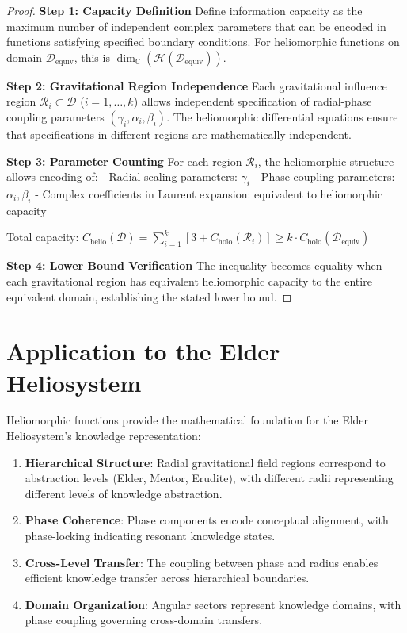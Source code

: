 \begin{proof}
\textbf{Step 1: Capacity Definition}
Define information capacity as the maximum number of independent complex parameters that can be encoded in functions satisfying specified boundary conditions. For heliomorphic functions on domain $\mathcal{D}_{\text{equiv}}$, this is $\dim_{\mathbb{C}}(\mathcal{H}(\mathcal{D}_{\text{equiv}}))$.

\textbf{Step 2: Gravitational Region Independence}
Each gravitational influence region $\mathcal{R}_i \subset \mathcal{D}$ ($i = 1, \ldots, k$) allows independent specification of radial-phase coupling parameters $(\gamma_i, \alpha_i, \beta_i)$. The heliomorphic differential equations ensure that specifications in different regions are mathematically independent.

\textbf{Step 3: Parameter Counting}
For each region $\mathcal{R}_i$, the heliomorphic structure allows encoding of:
- Radial scaling parameters: $\gamma_i$
- Phase coupling parameters: $\alpha_i, \beta_i$ 
- Complex coefficients in Laurent expansion: equivalent to heliomorphic capacity

Total capacity: $C_{\text{helio}}(\mathcal{D}) = \sum_{i=1}^k [3 + C_{\text{holo}}(\mathcal{R}_i)] \geq k \cdot C_{\text{holo}}(\mathcal{D}_{\text{equiv}})$

\textbf{Step 4: Lower Bound Verification}
The inequality becomes equality when each gravitational region has equivalent heliomorphic capacity to the entire equivalent domain, establishing the stated lower bound.
\end{proof}

\section{Application to the Elder Heliosystem}

Heliomorphic functions provide the mathematical foundation for the Elder Heliosystem's knowledge representation:

\begin{enumerate}
    \item \textbf{Hierarchical Structure}: Radial gravitational field regions correspond to abstraction levels (Elder, Mentor, Erudite), with different radii representing different levels of knowledge abstraction.
    
    \item \textbf{Phase Coherence}: Phase components encode conceptual alignment, with phase-locking indicating resonant knowledge states.
    
    \item \textbf{Cross-Level Transfer}: The coupling between phase and radius enables efficient knowledge transfer across hierarchical boundaries.
    
    \item \textbf{Domain Organization}: Angular sectors represent knowledge domains, with phase coupling governing cross-domain transfers.
\end{enumerate}

